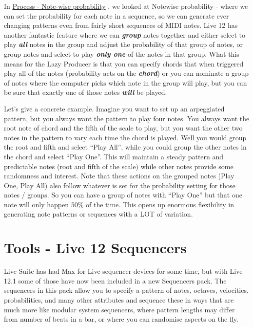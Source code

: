 \documentclass[
  12pt,
  letterpaper,
  oneside,
  open=any]{scrbook}
\makeatletter
\newcommand*\pandocbounded[1]{%
  \sbox\pandoc@box{#1}%
  \Gscale@div\@tempa{\textheight}{\dimexpr\ht\pandoc@box+\dp\pandoc@box\relax}%
  \Gscale@div\@tempb{\linewidth}{\wd\pandoc@box}%
  \ifdim\@tempb\p@<\@tempa\p@\let\@tempa\@tempb\fi%
  \ifdim\@tempa\p@<\p@\scalebox{\@tempa}{\usebox\pandoc@box}%
  \else\usebox{\pandoc@box}%
  \fi%
}
\makeatother
\begin{document}
In \hyperref[Chapter-002-Process-Note_wise_probability]{Process -
Note-wise probability} , we looked at Notewise probability - where we
can set the probability for each note in a sequence, so we can generate
ever changing patterns even from fairly short sequences of MIDI notes.
Live 12 has another fantastic feature where we can \textbf{\emph{group}}
notes together and either select to play \textbf{\emph{all}} notes in
the group and adjust the probability of that group of notes, or group
notes and select to play \textbf{\emph{only one}} of the notes in that
group. What this means for the Lazy Producer is that you can specify
chords that when triggered play all of the notes (probability acts on
the \textbf{\emph{chord}}) or you can nominate a group of notes where
the computer picks which note in the group will play, but you can be
sure that exactly one of those notes \textbf{\emph{will}} be played.

\pandocbounded{\texttt{[image: images/Live12\_GroupNotes.png]}}

Let's give a concrete example. Imagine you want to set up an arpeggiated
pattern, but you always want the pattern to play four notes. You always
want the root note of chord and the fifth of the scale to play, but you
want the other two notes in the pattern to vary each time the chord is
played. Well you would group the root and fifth and select ``Play All'',
while you could group the other notes in the chord and select ``Play
One''. This will maintain a steady pattern and predictable notes (root
and fifth of the scale) while other notes provide some randomness and
interest. Note that these actions on the grouped notes (Play One, Play
All) also follow whatever is set for the probability setting for those
notes / groups. So you can have a group of notes with ``Play One'' but
that one note will only happen 50\% of the time. This opens up enormous
flexibility in generating note patterns or sequences with a LOT of
variation.


\chapter{Tools - Live 12
Sequencers}\label{Chapter-031-Tools-Live12_Sequencers}

Live Suite has had Max for Live sequencer devices for some time, but
with Live 12.1 some of those have now been included in a new Sequencers
pack. The sequencers in this pack allow you to specify a pattern of
notes, octaves, velocities, probabilities, and many other attributes and
sequence these in ways that are much more like modular system
sequencers, where pattern lengths may differ from number of beats in a
bar, or where you can randomise aspects on the fly.
\end{document}
